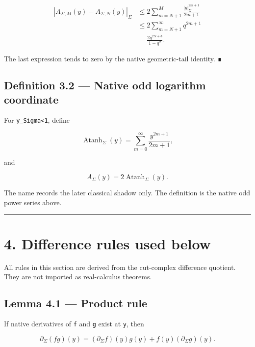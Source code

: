 \[
\begin{aligned}
|A_{\Sigma,M}(y)-A_{\Sigma,N}(y)|_\Sigma
&\le
2\sum_{m=N+1}^{M}
\frac{|y|_\Sigma^{2m+1}}{2m+1}\\
&\le
2\sum_{m=N+1}^{\infty}q^{2m+1}\\
&=
\frac{2q^{2N+3}}{1-q^2}.
\end{aligned}
\]

The last expression tends to zero by the native geometric-tail identity. ∎

\hypertarget{definition-3.2-native-odd-logarithm-coordinate}{%
\subsection{Definition 3.2 --- Native odd logarithm coordinate}\label{definition-3.2-native-odd-logarithm-coordinate}}

For \texttt{\textbar{}y\textbar{}\_Sigma\textless{}1}, define

\[
\boxed{
\operatorname{Atanh}_\Sigma(y)
=
\sum_{m=0}^{\infty}
\frac{y^{2m+1}}{2m+1},
}
\]

and

\[
\boxed{
A_\Sigma(y)=2\operatorname{Atanh}_\Sigma(y).
}
\]

The name records the later classical shadow only. The definition is the native
odd power series above.

\begin{center}\rule{0.5\linewidth}{0.5pt}\end{center}

\hypertarget{difference-rules-used-below}{%
\section{4. Difference rules used below}\label{difference-rules-used-below}}

All rules in this section are derived from the cut-complex difference quotient.
They are not imported as real-calculus theorems.

\hypertarget{lemma-4.1-product-rule}{%
\subsection{Lemma 4.1 --- Product rule}\label{lemma-4.1-product-rule}}

If native derivatives of \texttt{f} and \texttt{g} exist at \texttt{y}, then

\[
\partial_\Sigma(fg)(y)
=
(\partial_\Sigma f)(y)g(y)
+f(y)(\partial_\Sigma g)(y).
\]

